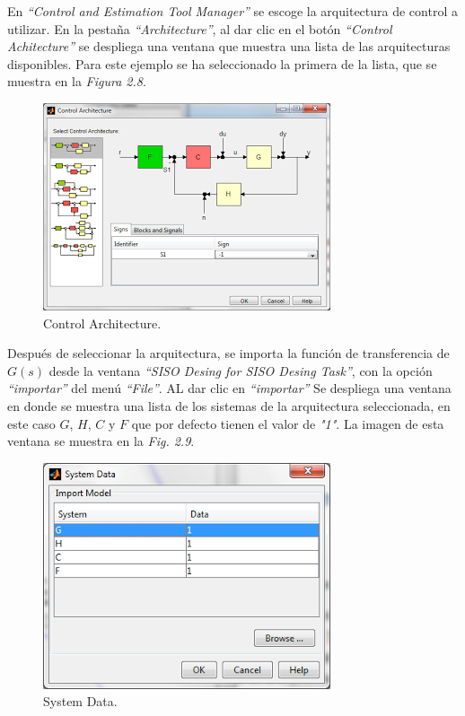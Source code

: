 \documentclass[a4paper,12pt,twoside]{proyectotanquesecci}
\begin{document}
En \textit{“Control and Estimation Tool Manager”} se escoge la arquitectura de control a utilizar. En la pestaña \textit{“Architecture”}, al dar clic en el botón \textit{“Control Achitecture”} se despliega una ventana que muestra una lista de las arquitecturas disponibles. Para este ejemplo se ha seleccionado la primera de la lista, que se muestra en la \textit{Figura 2.8}. \\

\begin{figure}[h]
\centering
\includegraphics[scale=0.7]{Ventana2}
\renewcommand{\figurename}{Fig.}
\caption{Control Architecture.}
\label{Control Architecture.}
\end{figure}

Después de seleccionar la arquitectura, se importa la función de transferencia de $G(s)$ desde la ventana \textit{“SISO Desing for SISO Desing Task”},  con la opción \textit{“importar”} del menú \textit{“File”}. AL dar clic en \textit{“importar”} Se despliega una ventana en donde se muestra una lista de los sistemas de la arquitectura seleccionada, en este caso  $G$, $H$, $C$ y $F$ que por defecto tienen el valor de \textit{"1"}. La imagen de esta ventana se muestra en la \textit{Fig. 2.9}. \\

\begin{figure}[h]
\centering
\includegraphics[scale=0.7]{Ventana3}
\renewcommand{\figurename}{Fig.}
\caption{System Data.}
\label{System Data.}
\end{figure}
\end{document}
